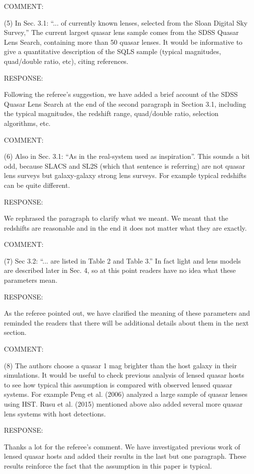 \documentclass[a4paper,11pt]{article}
\begin{document}
COMMENT:

(5) In Sec. 3.1: ``... of currently known lenses, selected 
from the Sloan Digital Sky Survey,'' The current largest quasar lens sample 
comes from the SDSS Quasar Lens Search, containing more than 50 quasar lenses. 
It would be informative to give a quantitative description of the SQLS sample 
(typical magnitudes, quad/double ratio, etc), citing references.


RESPONSE:

Following the referee's suggestion, we have added a brief account of
the SDSS Quasar Lens Search at the end of the second paragraph in
Section 3.1, including the typical magnitudes, the redshift range,
quad/double ratio, selection algorithms, etc.


COMMENT:

(6) Also in Sec. 3.1: ``As in the real-system used as inspiration''.
This sounds a bit odd, because SLACS and SL2S (which that sentence is
referring) are not quasar lens surveys but galaxy-galaxy strong lens
surveys.  For example typical redshifts can be quite different.


RESPONSE:

We rephrased the paragraph to clarify what we meant. We meant that the
redshifts are reasonable and in the end it does not matter what they
are exactly.


COMMENT:

(7) Sec 3.2: ``... are listed in Table 2 and Table 3.'' In fact light
and lens models are described later in Sec. 4, so at this point
readers have no idea what these parameters mean.


RESPONSE:

As the referee pointed out, we have clarified the meaning of these
parameters and reminded the readers that there will be additional
details about them in the next section.


COMMENT:

(8) The authors choose a quasar 1 mag brighter than the host galaxy in
their simulations.  It would be useful to check previous analysis of
lensed quasar hosts to see how typical this assumption is compared
with observed lensed quasar systems.  For example Peng et al. (2006)
analyzed a large sample of quasar lenses using HST.  Rusu et
al. (2015) mentioned above also added several more quasar lens systems
with host detections.


RESPONSE:

Thanks a lot for the referee's comment. We have investigated previous
work of lensed quasar hosts and added their results in the last but
one paragraph.  These results reinforce the fact that the assumption
in this paper is typical.
\end{document}
